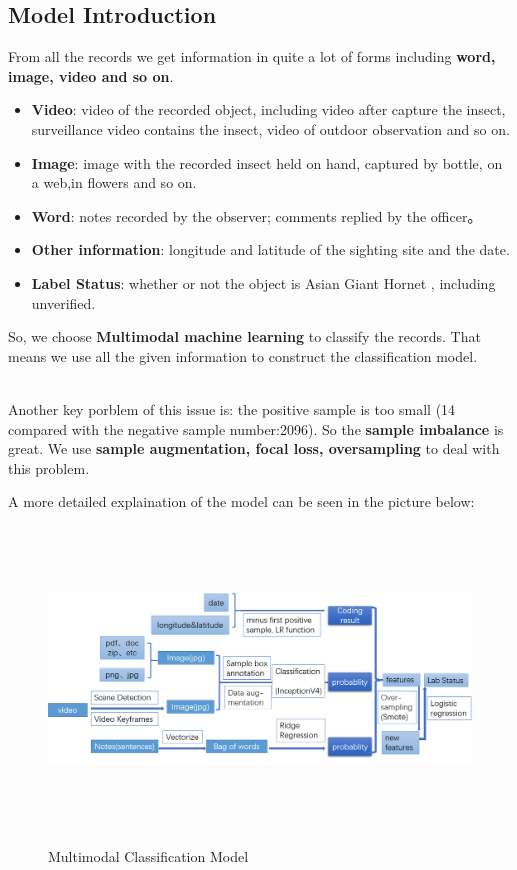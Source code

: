 \documentclass[12pt]{article}
\begin{document}
\subsection{Model Introduction}
From all the records we get information in quite a lot of forms including \textbf{word, image, video and so on}.
\begin{itemize}
	\item \textbf{Video}: video of the recorded object, including video after capture the insect, surveillance video contains the insect, video of outdoor observation and so on.
	\item \textbf{Image}: image with the recorded insect held on hand, captured by bottle, on a web,in flowers and so on.
	\item \textbf{Word}: notes recorded by the observer; comments replied by the officer。
	\item \textbf{Other information}: longitude and latitude of the sighting site and the date.
	\item \textbf{Label Status}: whether or not the object is Asian Giant Hornet , including unverified.
\end{itemize}

So, we choose \textbf{Multimodal machine learning} to classify the records.
That means we use all the given information to construct the classification model.

\quad \\
Another key porblem of this issue is: the positive sample is too small (14 compared with the negative sample number:2096). So the \textbf{sample imbalance} is great. We use \textbf{sample augmentation, focal loss, oversampling} to deal with this problem.

A more detailed explaination of the model can be seen in the picture below:
\begin{figure}[H]
	\centering
	\includegraphics[width=18cm,height=8cm]{./pictures/problem2.png}\label{overall}
	\caption{Multimodal Classification Model}
\end{figure}
\end{document}
